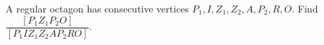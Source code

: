 A regular octagon has consecutive vertices $P_1,I,Z_1,Z_2,A,P_2,R,O$. Find $\dfrac{[P_1Z_1P_2O]}{[P_1IZ_1Z_2AP_2RO]}$.
